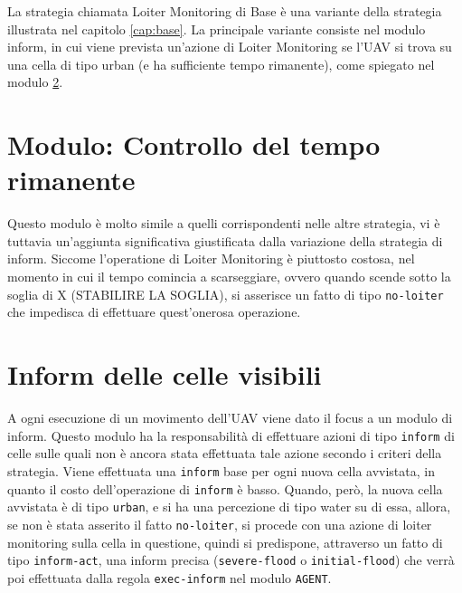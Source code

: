 La strategia chiamata Loiter Monitoring di Base è una variante della strategia illustrata nel capitolo \ref{cap:base}. La principale variante consiste nel modulo inform, in cui viene prevista un'azione di Loiter Monitoring se l'UAV si trova su una cella di tipo urban (e ha sufficiente tempo rimanente), come spiegato nel modulo \ref{sec:loiter-base-inform}.

\section{Modulo: Controllo del tempo rimanente} \label{sec:loiter-base-tempo}
Questo modulo è molto simile a quelli corrispondenti nelle altre strategia, vi è tuttavia un'aggiunta significativa giustificata dalla variazione della strategia di inform. Siccome l'operatione di Loiter Monitoring è piuttosto costosa, nel momento in cui il tempo comincia a scarseggiare, ovvero quando scende sotto la soglia di {\color{red}X (STABILIRE LA SOGLIA)}, si asserisce un fatto di tipo \texttt{no-loiter} che impedisca di effettuare quest'onerosa operazione.

\section{Inform delle celle visibili} \label{sec:loiter-base-inform}
A ogni esecuzione di un movimento dell'UAV viene dato il focus a un modulo di inform. Questo modulo ha la responsabilità di effettuare azioni di tipo \texttt{inform} di celle sulle quali non è ancora stata effettuata tale azione secondo i criteri della strategia. Viene effettuata una \texttt{inform} base per ogni nuova cella avvistata, in quanto il costo dell'operazione di \texttt{inform} è basso. Quando, però, la nuova cella avvistata è di tipo \texttt{urban}, e si ha una percezione di tipo water su di essa, allora, se non è stata asserito il fatto \texttt{no-loiter}, si procede con una azione di loiter monitoring sulla cella in questione, quindi si predispone, attraverso un fatto di tipo \texttt{inform-act}, una inform precisa (\texttt{severe-flood} o \texttt{initial-flood}) che verrà poi effettuata dalla regola \texttt{exec-inform} nel modulo \texttt{AGENT}.
